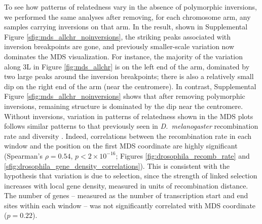 \documentclass[11pt, oneside]{article}   	%
\begin{document}
To see how patterns of relatedness vary in the absence of polymorphic inversions,
we performed the same analyses after removing, for each chromosome arm,
any samples carrying inversions on that arm.
In the result, shown in Supplemental Figure \ref{sfig:mds_allchr_noinversions},
the striking peaks associated with inversion breakpoints are gone,
and previously smaller-scale variation now dominates the MDS visualization.
For instance, the majority of the variation along 3L in Figure \ref{fig:mds_allchr}
is on the left end of the arm, dominated by two large peaks around the inversion breakpoints;
there is also a relatively small dip on the right end of the arm (near the centromere).
In contrast, Supplemental Figure \ref{sfig:mds_allchr_noinversions} shows that after removing polymorphic inversions,
remaining structure is dominated by the dip near the centromere.
Without inversions, variation in patterns of relatedness shown in the MDS plots
follows similar patterns to that previously seen in \textit{D.~melanogaster} recombination rate and diversity \citep{langley2012genomic,mackay2012drosophila}.
Indeed, correlations between the recombination rate in each window and the position on the first MDS coordinate are highly significant
(Spearman's $\rho=0.54$, $p<2 \times 10^{-16}$; Figures \ref{fig:drosophila_recomb_rate} and \ref{sfig:drosophila_gene_density_correlations}).
This is consistent with the hypothesis that variation
is due to selection, since the strength of linked selection increases with local gene density, 
measured in units of recombination distance.
The number of genes -- measured as the number of transcription start and end sites within each window --
was not significantly correlated with MDS coordinate ($p=0.22$).
\end{document}
